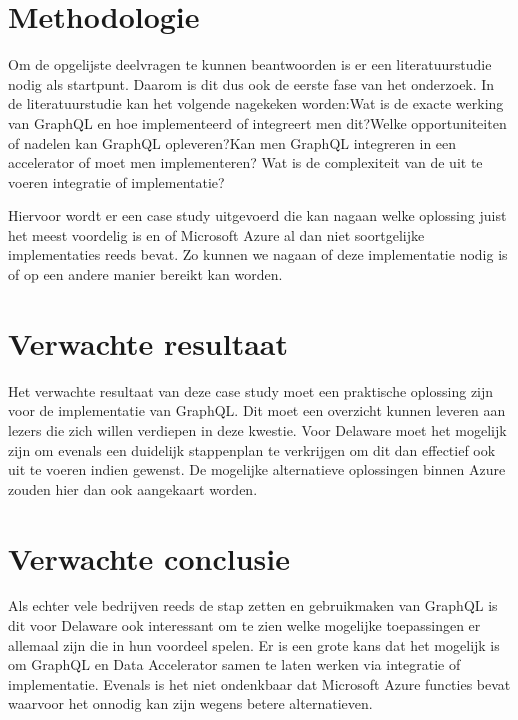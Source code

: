 \section{Methodologie}%
\label{sec:methodologie}

Om de opgelijste deelvragen te kunnen beantwoorden is er een literatuurstudie nodig als startpunt. Daarom is dit dus ook de eerste fase van het onderzoek. In de literatuurstudie kan het volgende nagekeken worden:\newline Wat is de exacte werking van GraphQL en hoe implementeerd of integreert men dit?\newline Welke opportuniteiten of nadelen kan GraphQL opleveren?\newline Kan men GraphQL integreren in een accelerator of moet men implementeren? \newline Wat is de complexiteit van de uit te voeren integratie of implementatie?

Hiervoor wordt er een case study uitgevoerd die kan nagaan welke oplossing juist het meest voordelig is en of Microsoft Azure al dan niet soortgelijke implementaties reeds bevat. Zo kunnen we nagaan of deze implementatie nodig is of op een andere manier bereikt kan worden.

\section{Verwachte resultaat}
\label{sec:verwachte resultaat}
Het verwachte resultaat van deze case study moet een praktische oplossing zijn voor de implementatie van GraphQL. Dit moet een overzicht kunnen leveren aan lezers die zich willen verdiepen in deze kwestie. Voor Delaware moet het mogelijk zijn om evenals een duidelijk stappenplan te verkrijgen om dit dan effectief ook uit te voeren indien gewenst. De mogelijke alternatieve oplossingen binnen Azure zouden hier dan ook aangekaart worden.

\section{Verwachte conclusie}
\label{sec:verwachte conclusiet}
Als echter vele bedrijven reeds de stap zetten en gebruikmaken van GraphQL is dit voor Delaware ook interessant om te zien welke mogelijke toepassingen er allemaal zijn die in hun voordeel spelen. Er is een grote kans dat het mogelijk is om GraphQL en Data Accelerator samen te laten werken via integratie of implementatie. Evenals is het niet ondenkbaar dat Microsoft Azure functies bevat waarvoor het onnodig kan zijn wegens betere alternatieven.
